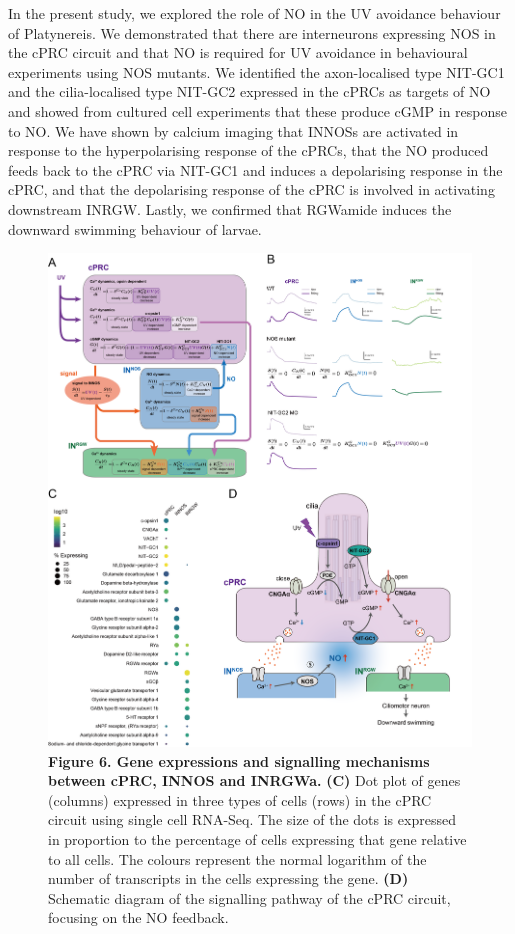 \documentclass[
  10pt,
  onecolumn]{article}
\begin{document}
In the present study, we explored the role of NO in the UV avoidance
behaviour of Platynereis. We demonstrated that there are interneurons
expressing NOS in the cPRC circuit and that NO is required for UV
avoidance in behavioural experiments using NOS mutants. We identified
the axon-localised type NIT-GC1 and the cilia-localised type NIT-GC2
expressed in the cPRCs as targets of NO and showed from cultured cell
experiments that these produce cGMP in response to NO. We have shown by
calcium imaging that INNOSs are activated in response to the
hyperpolarising response of the cPRCs, that the NO produced feeds back
to the cPRC via NIT-GC1 and induces a depolarising response in the cPRC,
and that the depolarising response of the cPRC is involved in activating
downstream INRGW. Lastly, we confirmed that RGWamide induces the
downward swimming behaviour of larvae.

\begin{figure}
\centering
\includegraphics[width=1\textwidth,height=\textheight]{../figures/Fig6.png}
\caption{\textbf{Figure 6. Gene expressions and signalling mechanisms
between cPRC, INNOS and INRGWa.} \textbf{(C)} Dot plot of genes
(columns) expressed in three types of cells (rows) in the cPRC circuit
using single cell RNA-Seq. The size of the dots is expressed in
proportion to the percentage of cells expressing that gene relative to
all cells. The colours represent the normal logarithm of the number of
transcripts in the cells expressing the gene. \textbf{(D)} Schematic
diagram of the signalling pathway of the cPRC circuit, focusing on the
NO feedback.}
\end{figure}
\end{document}
